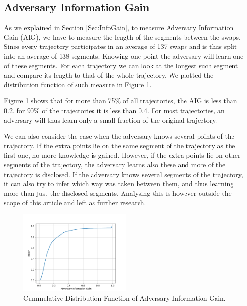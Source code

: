 \documentclass[review]{elsarticle}
\begin{document}
\subsection{Adversary Information Gain}
\label{sec:reidentification}
As we explained in Section \ref{Sec:InfoGain}, to measure Adversary Information Gain (AIG), we have to measure the 
length of the segments between the swaps. Since every trajectory
participates in an average of 137 swaps and is thus split into an
average of 138 segments. Knowing one point the adversary will learn
one of these segments. 
For each trajectory we can
look at the longest such segment and compare its length to that of the
whole trajectory. We plotted the distribution function of such measure in Figure \ref{fig:ECDF-max-part}. 

Figure \ref{fig:ECDF-max-part} shows that for more than 75\% of all
trajectories, the AIG is less than 0.2, for 90\% of the trajectories it is less
than 0.4. For most trajectories, an adversary will thus learn only a
small fraction of the original trajectory.

We can also consider the case when the adversary knows several points
of the trajectory. If the extra points lie on the same segment of the
trajectory as the first one, no more knowledge is gained. However, if
the extra points lie on other segments of the trajectory, the adversary
learns also these and more of the trajectory is disclosed. If the
adversary knows several segments of the trajectory, it can also try to
infer which way was taken between them, and thus learning more than
just the disclosed segments. Analysing this is however outside the
scope of this article and left as further research.

\begin{figure}
  \center
  \includegraphics[width=0.5\textwidth]{figures/ECDF-max-part.pdf}
  \caption{Cummulative Distribution Function of Adversary Information Gain.}
  \label{fig:ECDF-max-part}
\end{figure}
\end{document}
